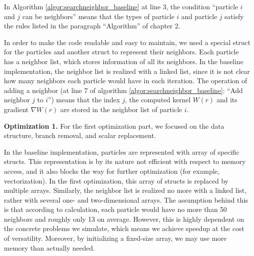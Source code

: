 \documentclass[letterpaper]{article}
\newcommand{\mypar}[1]{{\bf #1.}}
\begin{document}
In Algorithm \ref{algor:searchneighbor_baseline} at line 3, the condition ``particle $i$ and $j$ can be neighbors'' means that the types of particle $i$ and particle $j$ satisfy the rules listed in the paragraph ``Algorithm'' of chapter 2.

In order to make the code readable and easy to maintain, we used a special struct for the particles and another struct to represent their neighbors. Each particle has a neighbor list, which stores information of all its neighbors. In the baseline implementation, the neighbor list is realized with a linked list, since it is not clear how many neighbors each particle would have in each iteration. The operation of adding a neighbor (at line 7 of algorithm \ref{algor:searchneighbor_baseline}: ``Add neighbor $j$ to $i$'') means that the index $j$, the computed kernel $W(r)$ and its gradient $\nabla W(r)$ are stored in the neighbor list of particle $i$. 

\mypar{Optimization 1}
For the first optimization part, we focused on the data structure, branch removal, and scalar replacement. 

In the baseline implementation, particles are represented with array of specific structs. This representation is by its nature not efficient with respect to memory access, and it also blocks the way for further optimization (for example, vectorization). In the first optimization, this array of structs is replaced by multiple arrays. Similarly, the neighbor list is realized no more with a linked list, rather with several one- and two-dimensional arrays. The assumption behind this is that according to calculation, each particle would have no more than 50 neighbors and roughly only 13 on average. However, this is highly dependent on the concrete problems we simulate, which means we achieve speedup at the cost of versatility. Moreover, by initializing a fixed-size array, we may use more memory than actually needed.
\end{document}
